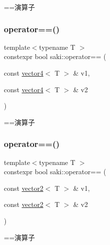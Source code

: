 ==演算子 

\mbox{\label{namespacesaki_abe77ceb7257097320a66f9f182d11111}} 
\subsubsection{\texorpdfstring{operator==()}{operator==()}\hspace{0.1cm}{\footnotesize\ttfamily [5/11]}}
{\footnotesize\ttfamily template$<$typename T $>$ \\
constexpr bool saki\+::operator== (\begin{DoxyParamCaption}\item[{const \mbox{\hyperlink{classsaki_1_1vector4}{vector4}}$<$ T $>$ \&}]{v1,  }\item[{const \mbox{\hyperlink{classsaki_1_1vector4}{vector4}}$<$ T $>$ \&}]{v2 }\end{DoxyParamCaption})}



==演算子 

\mbox{\label{namespacesaki_a2aafc5056183a1a522b89497ee3439e9}} 
\subsubsection{\texorpdfstring{operator==()}{operator==()}\hspace{0.1cm}{\footnotesize\ttfamily [6/11]}}
{\footnotesize\ttfamily template$<$typename T $>$ \\
constexpr bool saki\+::operator== (\begin{DoxyParamCaption}\item[{const \mbox{\hyperlink{classsaki_1_1vector2}{vector2}}$<$ T $>$ \&}]{v1,  }\item[{const \mbox{\hyperlink{classsaki_1_1vector2}{vector2}}$<$ T $>$ \&}]{v2 }\end{DoxyParamCaption})}



==演算子 

\mbox{\label{namespacesaki_af2a10e5e2974f482b6da75d9137dc143}} 
